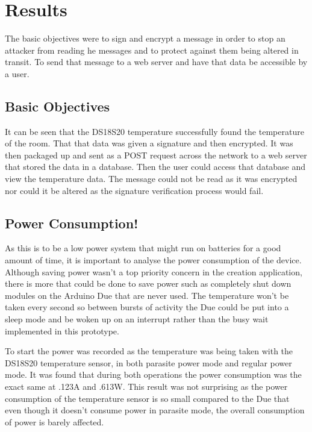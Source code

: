 \chapter{Results}
\label{res}

The basic objectives were to sign and encrypt a message in order to stop an attacker from reading he messages and to protect against them being altered in transit. To send that message to a web server and have that data be accessible by a user.

\section{Basic Objectives}

It can be seen that the DS18S20 temperature successfully found the temperature of the room. That that data was given a signature and then encrypted. It was then packaged up and sent as a POST request across the network to a web server that stored the data in a database. Then the user could access that database and view the temperature data. The message could not be read as it was encrypted nor could it be altered as the signature verification process would fail. 

\section{Power Consumption!}

As this is to be a low power system that might run on batteries for a good amount of time, it is important to analyse the power consumption of the device. Although saving power wasn't a top priority concern in the creation application, there is more that could be done to save power such as completely shut down modules on the Arduino Due that are never used. The temperature won't be taken every second so between bursts of activity the Due could be put into a sleep mode and be woken up on an interrupt rather than the busy wait implemented in this prototype.

To start the power was recorded as the temperature was being taken with the DS18S20 temperature sensor, in both parasite power mode and regular power mode. It was found that during both operations the power consumption was the exact same at .123A and .613W. This result was not surprising as the power consumption of the temperature sensor is so small compared to the Due that even though it doesn't consume power in parasite mode, the overall consumption of power is barely affected.

